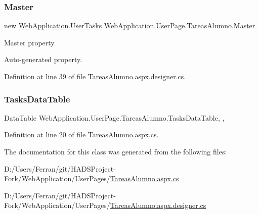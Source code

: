 \subsubsection{\texorpdfstring{Master}{Master}}
{\footnotesize\ttfamily new \mbox{\hyperlink{classWebApplication_1_1UserTasks}{Web\+Application.\+User\+Tasks}} Web\+Application.\+User\+Page.\+Tareas\+Alumno.\+Master\hspace{0.3cm}{\ttfamily [get]}}



Master property. 

Auto-\/generated property. 

Definition at line 39 of file Tareas\+Alumno.\+aspx.\+designer.\+cs.

\mbox{\label{classWebApplication_1_1UserPage_1_1TareasAlumno_a8821f4d83835e4451c0bcc48fea3001f}} 
\subsubsection{\texorpdfstring{TasksDataTable}{TasksDataTable}}
{\footnotesize\ttfamily Data\+Table Web\+Application.\+User\+Page.\+Tareas\+Alumno.\+Tasks\+Data\+Table\hspace{0.3cm}{\ttfamily [get]}, {\ttfamily [set]}, {\ttfamily [private]}}



Definition at line 20 of file Tareas\+Alumno.\+aspx.\+cs.



The documentation for this class was generated from the following files\+:\begin{DoxyCompactItemize}
\item 
D\+:/\+Users/\+Ferran/git/\+H\+A\+D\+S\+Project-\/\+Fork/\+Web\+Application/\+User\+Pages/\mbox{\hyperlink{TareasAlumno_8aspx_8cs}{Tareas\+Alumno.\+aspx.\+cs}}\item 
D\+:/\+Users/\+Ferran/git/\+H\+A\+D\+S\+Project-\/\+Fork/\+Web\+Application/\+User\+Pages/\mbox{\hyperlink{TareasAlumno_8aspx_8designer_8cs}{Tareas\+Alumno.\+aspx.\+designer.\+cs}}\end{DoxyCompactItemize}
